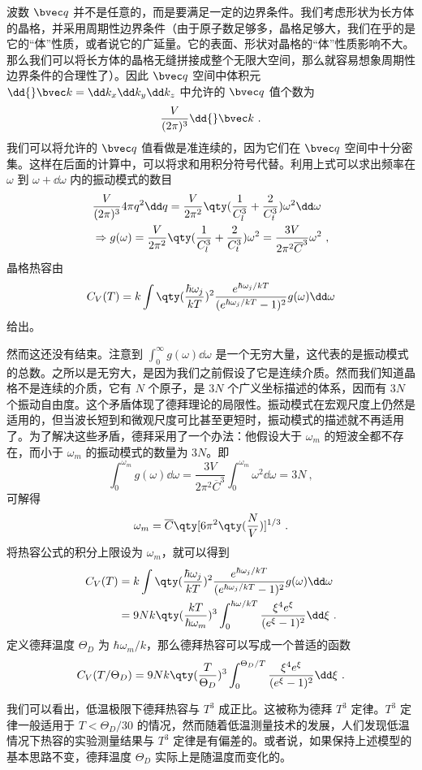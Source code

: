 波数 $\bvec q$ 并不是任意的，而是要满足一定的边界条件。我们考虑形状为长方体的晶格，并采用周期性边界条件（由于原子数足够多，晶格足够大，我们在乎的是它的“体”性质，或者说它的广延量。它的表面、形状对晶格的“体”性质影响不大。那么我们可以将长方体的晶格无缝拼接成整个无限大空间，那么就容易想象周期性边界条件的合理性了）。因此 $\bvec q$ 空间中体积元 $\dd{} \bvec k=\dd k_x\dd k_y\dd k_z$ 中允许的 $\bvec q$ 值个数为
\begin{equation}
\frac{V}{(2\pi)^3} \dd{} \bvec k~.
\end{equation}
我们可以将允许的 $\bvec q$ 值看做是准连续的，因为它们在 $\bvec q$ 空间中十分密集。这样在后面的计算中，可以将求和用积分符号代替。利用上式可以求出频率在 $\omega$ 到 $\omega+\dd \omega$ 内的振动模式的数目
\begin{equation}
\begin{aligned}
&\frac{V}{(2\pi)^3}4\pi q^2\dd q=\frac{V}{2\pi^2}\qty(\frac{1}{C_l^3}+\frac{2}{C_t^3})\omega^2\dd \omega\\
&\Rightarrow g(\omega)= \frac{V}{2\pi^2}\qty(\frac{1}{C_l^3}+\frac{2}{C_t^3}) \omega^2=\frac{3V}{2\pi^2 \overline C ^3} \omega^2~,
\end{aligned}
\end{equation}
晶格热容由
\begin{equation}
C_V(T)=k \int \qty(\frac{\hbar\omega_j}{kT})^2\frac{e^{\hbar \omega_j/kT}}{(e^{\hbar\omega_j/kT}-1)^2} g(\omega)\dd \omega
\end{equation}
给出。

然而这还没有结束。注意到 $\int_0^\infty g(\omega)\dd \omega$ 是一个无穷大量，这代表的是振动模式的总数。之所以是无穷大，是因为我们之前假设了它是连续介质。然而我们知道晶格不是连续的介质，它有 $N$ 个原子，是 $3N$ 个广义坐标描述的体系，因而有 $3N$ 个振动自由度。这个矛盾体现了德拜理论的局限性。振动模式在宏观尺度上仍然是适用的，但当波长短到和微观尺度可比甚至更短时，振动模式的描述就不再适用了。为了解决这些矛盾，德拜采用了一个办法：他假设大于 $\omega_m$ 的短波全都不存在，而小于 $\omega_m$ 的振动模式的数量为 $3N$。即
\begin{equation}
\int_0^{\omega_m} g(\omega)\dd \omega = \frac{3V}{2\pi^2\overline C^3}\int_0^{\omega_m}\omega^2\dd \omega =3N~,
\end{equation}
可解得
\begin{equation}
\omega_m = \overline C \qty[6\pi^2 \qty(\frac{N}{V})]^{1/3}~.
\end{equation}
将热容公式的积分上限设为 $\omega_m$，就可以得到
\begin{equation}
\begin{aligned}
C_V(T)&=k \int \qty(\frac{\hbar\omega_j}{kT})^2\frac{e^{\hbar \omega_j/kT}}{(e^{\hbar\omega_j/kT}-1)^2} g(\omega)\dd \omega\\
&=9Nk\qty(\frac{kT}{\hbar\omega_m})^3 \int_0^{\hbar\omega/kT} \frac{\xi^4 e^\xi}{(e^\xi-1)^2}\dd \xi~.
\end{aligned}
\end{equation}
定义德拜温度 $\Theta_D$ 为 $\hbar\omega_m/k$，那么德拜热容可以写成一个普适的函数
\begin{equation}
C_V(T/\Theta_D)=9Nk\qty(\frac{T}{\Theta_D})^3 \int_0^{\Theta_D/T}\frac{\xi^4 e^{\xi}}{(e^\xi-1)^2}\dd \xi~.
\end{equation}

我们可以看出，低温极限下德拜热容与 $T^3$ 成正比。这被称为德拜 $T^3$ 定律。$T^3$ 定律一般适用于 $T<\Theta_D/30$ 的情况，然而随着低温测量技术的发展，人们发现低温情况下热容的实验测量结果与 $T^3$ 定律是有偏差的。或者说，如果保持上述模型的基本思路不变，德拜温度 $\Theta_D$ 实际上是随温度而变化的。